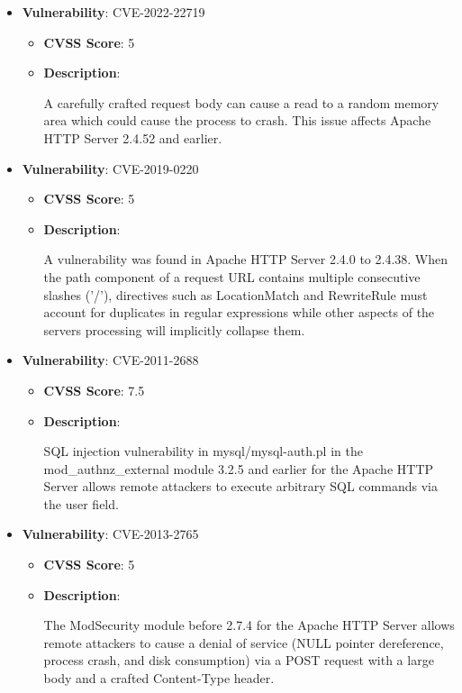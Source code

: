 \documentclass{article}
\begin{document}
\begin{itemize}
        \item \textbf{Vulnerability}: CVE-2022-22719
        \begin{itemize}
            \item \textbf{CVSS Score}:  5 
            \item \textbf{Description}:
            \parbox[t]{0.9\linewidth}{
                \ttfamily A carefully crafted request body can cause a read to a random memory area which could cause the process to crash. This issue affects Apache HTTP Server 2.4.52 and earlier.
            }
        \end{itemize}
    
        \item \textbf{Vulnerability}: CVE-2019-0220
        \begin{itemize}
            \item \textbf{CVSS Score}:  5 
            \item \textbf{Description}:
            \parbox[t]{0.9\linewidth}{
                \ttfamily A vulnerability was found in Apache HTTP Server 2.4.0 to 2.4.38. When the path component of a request URL contains multiple consecutive slashes ('/'), directives such as LocationMatch and RewriteRule must account for duplicates in regular expressions while other aspects of the servers processing will implicitly collapse them.
            }
        \end{itemize}
    
        \item \textbf{Vulnerability}: CVE-2011-2688
        \begin{itemize}
            \item \textbf{CVSS Score}:  7.5 
            \item \textbf{Description}:
            \parbox[t]{0.9\linewidth}{
                \ttfamily SQL injection vulnerability in mysql/mysql-auth.pl in the mod\_authnz\_external module 3.2.5 and earlier for the Apache HTTP Server allows remote attackers to execute arbitrary SQL commands via the user field.
            }
        \end{itemize}
    
        \item \textbf{Vulnerability}: CVE-2013-2765
        \begin{itemize}
            \item \textbf{CVSS Score}:  5 
            \item \textbf{Description}:
            \parbox[t]{0.9\linewidth}{
                \ttfamily The ModSecurity module before 2.7.4 for the Apache HTTP Server allows remote attackers to cause a denial of service (NULL pointer dereference, process crash, and disk consumption) via a POST request with a large body and a crafted Content-Type header.
            }
        \end{itemize}
    

\end{itemize}
\end{document}
